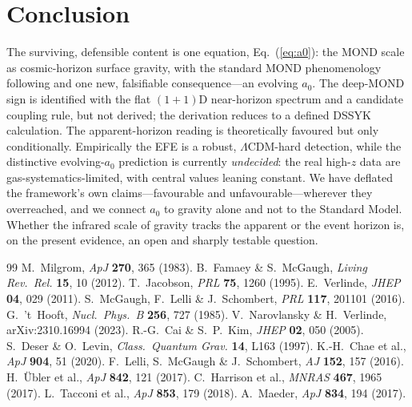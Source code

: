 \documentclass[11pt]{article}
\newcommand{\az}{a_0}
\begin{document}
\section{Conclusion}
The surviving, defensible content is one equation, Eq.~(\ref{eq:a0}): the MOND scale as cosmic-horizon
surface gravity, with the standard MOND phenomenology following and one new, falsifiable consequence---an
evolving $\az$. The deep-MOND sign is identified with the flat $(1{+}1)$D near-horizon spectrum and a
candidate coupling rule, but not derived; the derivation reduces to a defined DSSYK calculation. The
apparent-horizon reading is theoretically favoured but only conditionally. Empirically the EFE is a
robust, $\Lambda$CDM-hard detection, while the distinctive evolving-$\az$ prediction is currently
\emph{undecided}: the real high-$z$ data are gas-systematics-limited, with central values leaning
constant. We have deflated the framework's own claims---favourable and unfavourable---wherever they
overreached, and we connect $\az$ to gravity alone and not to the Standard Model. Whether the infrared
scale of gravity tracks the apparent or the event horizon is, on the present evidence, an open and
sharply testable question.

\begin{thebibliography}{99}\small
{} M.~Milgrom, \textit{ApJ} \textbf{270}, 365 (1983).
 B.~Famaey \& S.~McGaugh, \textit{Living Rev.\ Rel.} \textbf{15}, 10 (2012).
 T.~Jacobson, \textit{PRL} \textbf{75}, 1260 (1995).
 E.~Verlinde, \textit{JHEP} \textbf{04}, 029 (2011).
 S.~McGaugh, F.~Lelli \& J.~Schombert, \textit{PRL} \textbf{117}, 201101 (2016).
 G.~'t~Hooft, \textit{Nucl.\ Phys.\ B} \textbf{256}, 727 (1985).
 V.~Narovlansky \& H.~Verlinde, arXiv:2310.16994 (2023).
 R.-G.~Cai \& S.~P.~Kim, \textit{JHEP} \textbf{02}, 050 (2005).
 S.~Deser \& O.~Levin, \textit{Class.\ Quantum Grav.} \textbf{14}, L163 (1997).
 K.-H.~Chae et al., \textit{ApJ} \textbf{904}, 51 (2020).
 F.~Lelli, S.~McGaugh \& J.~Schombert, \textit{AJ} \textbf{152}, 157 (2016).
 H.~\"Ubler et al., \textit{ApJ} \textbf{842}, 121 (2017).
 C.~Harrison et al., \textit{MNRAS} \textbf{467}, 1965 (2017).
 L.~Tacconi et al., \textit{ApJ} \textbf{853}, 179 (2018).
 A.~Maeder, \textit{ApJ} \textbf{834}, 194 (2017).
\end{thebibliography}
\end{document}
